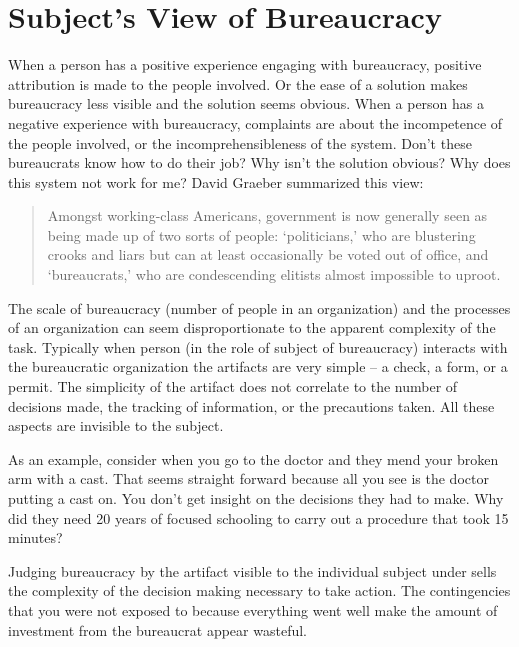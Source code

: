 \section{Subject's View of Bureaucracy\label{sec:subjects-view}}


When a person has a positive experience engaging with bureaucracy, positive attribution is made to the people involved. Or the ease of a solution makes bureaucracy less visible and the solution seems obvious. 
When a person has a negative experience with bureaucracy, complaints are about the incompetence of the people involved, or the incomprehensibleness of the system. Don't these bureaucrats know how to do their job? Why isn't the solution obvious? Why does this system not work for me? David Graeber summarized this view:
\begin{quote}
 Amongst working-class Americans, government is now generally seen as being made up of two sorts of people: `politicians,' who are blustering crooks and liars but can at least occasionally be voted out of office, and `bureaucrats,' who are condescending elitists almost impossible to uproot.   
\end{quote}


The scale of bureaucracy (number of people in an organization) and the processes of an organization can seem disproportionate to the apparent complexity of the task. Typically when person (in the role of subject of bureaucracy) interacts with the bureaucratic organization the artifacts are very simple -- a check, a form, or a permit. The simplicity of the artifact does not correlate to the number of decisions made, the tracking of information, or the precautions taken. All these aspects are invisible to the subject.

As an example, consider when you go to the doctor and they mend your broken arm with a cast. That seems straight forward because all you see is the doctor putting a cast on. You don't get insight on the decisions they had to make. Why did they need 20 years of focused schooling to carry out a procedure that took 15 minutes?

Judging bureaucracy by the artifact visible to the individual subject under sells the complexity of the decision making necessary to take action. The contingencies that you were not exposed to because everything went well make the amount of investment from the bureaucrat appear wasteful.

